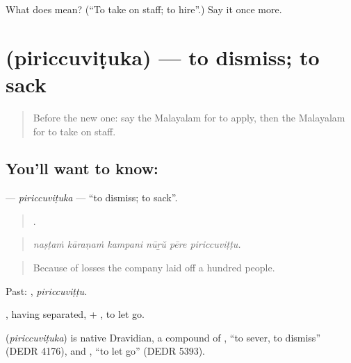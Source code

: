\begin{tcolorbox}[breakable,colback=teal!4,colframe=teal!35!black,title={Before you move on}]
What does  mean? (\textquotedblleft{}To take on staff; to hire\textquotedblright{}.) Say it once more.
\end{tcolorbox}
\section[\texorpdfstring{\ml{പിരിച്ചുവിടുക} (piriccuviṭuka)}{പിരിച്ചുവിടുക (piriccuviṭuka)}]{ (piriccuviṭuka) — to dismiss; to sack}

\label{lesson:ML-C543-piriccuvituka}



\begin{quote}
Before the new one: say the Malayalam for to apply, then the Malayalam for to take on staff.
\end{quote}

\subsection*{You'll want to know: }
\textbf{} — \emph{piriccuviṭuka} — \textquotedblleft{}to dismiss; to sack\textquotedblright{}.

\begin{quote}
     .
\end{quote}

\begin{quote}
\emph{naṣṭaṁ kāraṇaṁ kampani nūṟŭ pēre piriccuviṭṭu.}
\end{quote}

\begin{quote}
Because of losses the company laid off a hundred people.
\end{quote}

Past: , \emph{piriccuviṭṭu}.

, having separated, + , to let go.

\begin{cousinweb}
\textbf{} (\emph{piriccuviṭuka}) is native Dravidian, a compound of , \textquotedblleft{}to sever, to dismiss\textquotedblright{} (DEDR 4176), and , \textquotedblleft{}to let go\textquotedblright{} (DEDR 5393).
\end{cousinweb}

